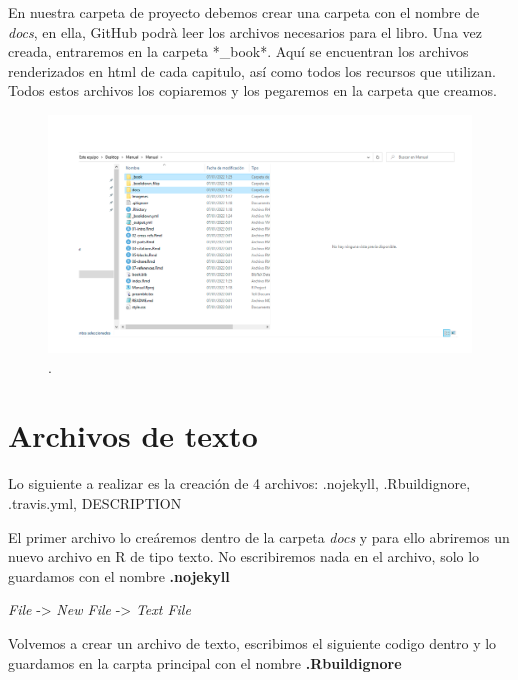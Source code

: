\documentclass[
  11pt,
  spanish,
  oneside]{book}
\begin{document}
En nuestra carpeta de proyecto debemos crear una carpeta con el nombre de \emph{docs}, en ella, GitHub podrà leer los archivos necesarios para el libro. Una vez creada, entraremos en la carpeta *\_book*. Aquí se encuentran los archivos renderizados en html de cada capitulo, así como todos los recursos que utilizan. Todos estos archivos los copiaremos y los pegaremos en la carpeta que creamos.

\begin{figure}

{\centering \includegraphics[width=1\linewidth]{imagenes/Imagen 5} 

}

\caption{.}\label{fig:unnamed-chunk-5}
\end{figure}

\hypertarget{archivos-de-texto}{%
\section*{Archivos de texto}\label{archivos-de-texto}}

Lo siguiente a realizar es la creación de 4 archivos: .nojekyll, .Rbuildignore, .travis.yml, DESCRIPTION

El primer archivo lo creáremos dentro de la carpeta \emph{docs} y para ello abriremos un nuevo archivo en R de tipo texto. No escribiremos nada en el archivo, solo lo guardamos con el nombre \textbf{.nojekyll}

\emph{File} -\textgreater{} \emph{New File} -\textgreater{} \emph{Text File}

Volvemos a crear un archivo de texto, escribimos el siguiente codigo dentro y lo guardamos en la carpta principal con el nombre \textbf{.Rbuildignore}
\end{document}
